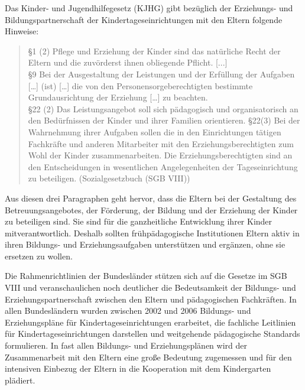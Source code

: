 \documentclass[12pt,a4paper]{article}
\begin{document}
	Das Kinder- und Jugendhilfegesetz (KJHG) gibt bezüglich der Erziehungs- und Bildungspartnerschaft der Kindertageseinrichtungen mit den Eltern folgende Hinweise:
	\begin{quote}
§1 (2)    Pflege und Erziehung der Kinder sind das natürliche Recht der    	     	  Eltern und die zuvörderst ihnen obliegende Pflicht. [...]\\
§9     Bei der Ausgestaltung der Leistungen und der Erfüllung der    Aufgaben […]  (ist)  […] die von den Personensorgeberechtigten bestimmte Grundausrichtung der  Erziehung […] zu beachten.\\
§22 (2)   Das Leistungsangebot soll sich pädagogisch und organisatorisch 	   an den Bedürfnissen der Kinder und ihrer Familien orientieren.
§22(3)   Bei der Wahrnehmung ihrer Aufgaben sollen die in den  	   	  	  Einrichtungen tätigen Fachkräfte und anderen Mitarbeiter 	  	 mit den Erziehungsberechtigten zum Wohl der Kinder 		zusammenarbeiten. Die Erziehungsberechtigten sind an den 	Entscheidungen in wesentlichen Angelegenheiten der 	Tageseinrichtung zu beteiligen. (Sozialgesetzbuch (SGB VIII))
\end{quote}
Aus diesen drei Paragraphen geht hervor, dass die Eltern bei der Gestaltung des Betreuungsangebotes, der Förderung, der Bildung und der Erziehung der Kinder zu beteiligen sind. Sie sind für die ganzheitliche Entwicklung ihrer Kinder mitverantwortlich. Deshalb sollten frühpädagogische Institutionen Eltern aktiv in ihren Bildungs- und Erziehungsaufgaben unterstützen und ergänzen, ohne sie ersetzen zu wollen.

	Die Rahmenrichtlinien der Bundesländer stützen sich auf die Gesetze im SGB VIII und veranschaulichen noch deutlicher die Bedeutsamkeit der Bildungs- und Erziehungspartnerschaft zwischen den Eltern und pädagogischen Fachkräften. In allen Bundesländern wurden zwischen 2002 und 2006 Bildungs- und Erziehungspläne für Kindertageseinrichtungen erarbeitet, die fachliche Leitlinien für Kindertageseinrichtungen darstellen und weitgehende pädagogische Standards formulieren. In fast allen Bildungs- und Erziehungsplänen wird der Zusammenarbeit mit den Eltern eine große Bedeutung zugemessen und für den intensiven Einbezug der Eltern in die Kooperation mit dem Kindergarten plädiert.
	
\end{document}
